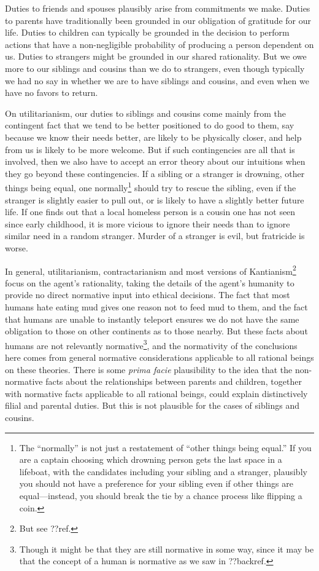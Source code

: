 Duties to friends and spouses plausibly
arise from commitments we make. Duties to parents have traditionally been grounded in our obligation of gratitude for our life. Duties to children can
typically be grounded in the decision to perform actions that have a non-negligible probability of producing a person dependent on us. Duties to strangers
might be grounded in our shared rationality. But we owe more to our siblings and cousins than we do to strangers, even though typically we had no say in whether
we are to have siblings and cousins, and even when we have no favors to return.

On utilitarianism, our duties to siblings and cousins come mainly from the contingent fact that we tend to be better positioned to do good to them, say because we know
their needs better, are likely to be physically closer, and help from us is likely to be more welcome. But if such contingencies are all that is involved, then we also
have to accept an error theory about our intuitions when they go beyond these contingencies. If a sibling or a stranger is drowning, other things being equal, one normally\footnote{The ``normally'' is not just a restatement of ``other things
being equal.'' If you are a captain choosing which drowning person gets the last space in a lifeboat, with the candidates including
your sibling and a stranger, plausibly you should not have a preference for your sibling even if other things are equal---instead, you
should break the tie by a chance process like flipping a coin.} should
try to rescue the sibling, even if the stranger is slightly easier to pull out, or is likely to have a slightly better future life. If one finds out that a local
homeless person is a cousin one has not seen since early childhood, it is more vicious to ignore their needs than to ignore similar need in a random stranger.
Murder of a stranger is evil, but fratricide is worse.

In general, utilitarianism, contractarianism and most versions of Kantianism\footnote{But see ??ref.} focus on the agent's rationality, taking the details of the agent's humanity to provide no direct normative
input into ethical decisions. The fact that most humans hate eating mud gives one reason not to feed mud to them, and the fact that humans are unable to instantly
teleport ensures we do not have the same obligation to those on other continents as to those nearby. But these facts
about humans are not relevantly normative\footnote{Though it might be that they are still normative in some way, since
it may be that the concept of a human is normative as we saw in ??backref.}, and the normativity of the
conclusions here comes from general normative considerations applicable to all rational beings on these theories. There is some \textit{prima facie} plausibility to the idea
that the non-normative facts about the relationships between parents and children, together with normative facts applicable to all rational beings, could explain
distinctively filial and parental duties. But this is not plausible for the cases of siblings and cousins.


